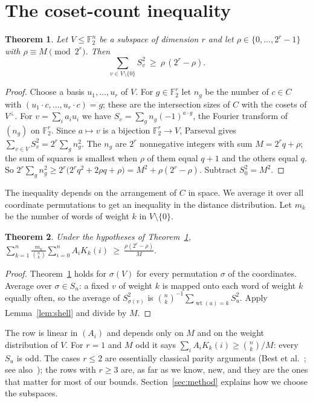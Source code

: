 \documentclass[11pt]{article}
\newtheorem{theorem}{Theorem}
\theoremstyle{remark}
\newcommand{\F}{\mathbb{F}_2}
\DeclareMathOperator{\wt}{wt}
\begin{document}
\section{The coset-count inequality}

\begin{theorem}\label{thm:main}
Let $V\le\F^n$ be a subspace of dimension $r$ and let $\rho\in\{0,\dots,2^r-1\}$ with $\rho\equiv M \pmod{2^r}$. Then
\[
\sum_{v\in V\setminus\{0\}} S_v^2\ \ge\ \rho\,(2^r-\rho).
\]
\end{theorem}
\begin{proof}
Choose a basis $u_1,\dots,u_r$ of $V$. For $g\in\F^r$ let $n_g$ be the number of $c\in C$ with
$(u_1\cdot c,\dots,u_r\cdot c)=g$; these are the intersection sizes of $C$ with the cosets of $V^\perp$.
For $v=\sum_i a_iu_i$ we have $S_v=\sum_g n_g(-1)^{a\cdot g}$, the Fourier transform of $(n_g)$ on $\F^r$.
Since $a\mapsto v$ is a bijection $\F^r\to V$, Parseval gives $\sum_{v\in V}S_v^2=2^r\sum_g n_g^2$.
The $n_g$ are $2^r$ nonnegative integers with sum $M=2^rq+\rho$; the sum of squares is smallest when $\rho$ of them
equal $q+1$ and the others equal $q$. So $2^r\sum_g n_g^2\ge 2^r\bigl(2^rq^2+2\rho q+\rho\bigr)=M^2+\rho(2^r-\rho)$.
Subtract $S_0^2=M^2$.
\end{proof}

The inequality depends on the arrangement of $C$ in space. We average it over all coordinate permutations to get
an inequality in the distance distribution. Let $m_k$ be the number of words of weight $k$ in $V\setminus\{0\}$.

\begin{theorem}\label{thm:row}
Under the hypotheses of Theorem~\ref{thm:main},
$\displaystyle\sum_{k=1}^n \frac{m_k}{\binom nk}\sum_{i=0}^n A_iK_k(i)\ \ge\ \frac{\rho(2^r-\rho)}{M}.$
\end{theorem}
\begin{proof}
Theorem~\ref{thm:main} holds for $\sigma(V)$ for every permutation $\sigma$ of the coordinates.
Average over $\sigma\in S_n$: a fixed $v$ of weight $k$ is mapped onto each word of weight $k$ equally often,
so the average of $S_{\sigma(v)}^2$ is $\binom nk^{-1}\sum_{\wt(u)=k}S_u^2$. Apply Lemma~\ref{lem:shell} and divide by $M$.
\end{proof}

The row is linear in $(A_i)$ and depends only on $M$ and on the weight distribution of $V$.
For $r=1$ and $M$ odd it says $\sum_iA_iK_k(i)\ge\binom nk/M$: every $S_u$ is odd. The cases $r\le2$ are
essentially classical parity arguments (Best et al.~\cite{BBMOS}; see also~\cite{AVZ,KT}); the rows with $r\ge3$
are, as far as we know, new, and they are the ones that matter for most of our bounds. Section~\ref{sec:method} explains how we choose the subspaces.
\end{document}
